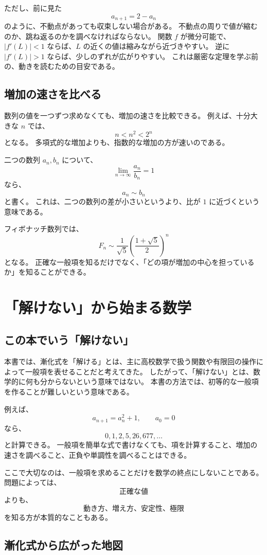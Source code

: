 ただし、前に見た
\[
  a_{n+1}=2-a_n
\]
のように、不動点があっても収束しない場合がある。
不動点の周りで値が縮むのか、跳ね返るのかを調べなければならない。
関数 $f$ が微分可能で、$|f'(L)|<1$ ならば、$L$ の近くの値は縮みながら近づきやすい。
逆に $|f'(L)|>1$ ならば、少しのずれが広がりやすい。
これは厳密な定理を学ぶ前の、動きを読むための目安である。

\subsection{増加の速さを比べる}

数列の値を一つずつ求めなくても、増加の速さを比較できる。
例えば、十分大きな $n$ では、
\[
  n<n^2<2^n
\]
となる。
多項式的な増加よりも、指数的な増加の方が速いのである。

二つの数列 $a_n,b_n$ について、
\[
  \lim_{n\to\infty}\frac{a_n}{b_n}=1
\]
なら、
\[
  a_n\sim b_n
\]
と書く。
これは、二つの数列の差が小さいというより、比が $1$ に近づくという意味である。

フィボナッチ数列では、
\[
  F_n\sim\frac1{\sqrt5}
  \left(\frac{1+\sqrt5}{2}\right)^n
\]
となる。
正確な一般項を知るだけでなく、「どの項が増加の中心を担っているか」を知ることができる。

\section{「解けない」から始まる数学}

\subsection{この本でいう「解けない」}

本書では、漸化式を「解ける」とは、主に高校数学で扱う関数や有限回の操作によって一般項を表せることだと考えてきた。
したがって、「解けない」とは、数学的に何も分からないという意味ではない。
本書の方法では、初等的な一般項を作ることが難しいという意味である。

例えば、
\[
  a_{n+1}=a_n^2+1,\qquad a_0=0
\]
なら、
\[
  0,1,2,5,26,677,\ldots
\]
と計算できる。
一般項を簡単な式で書けなくても、項を計算すること、増加の速さを調べること、正負や単調性を調べることはできる。

ここで大切なのは、一般項を求めることだけを数学の終点にしないことである。
問題によっては、
\[
  \text{正確な値}
\]
よりも、
\[
  \text{動き方、増え方、安定性、極限}
\]
を知る方が本質的なこともある。

\subsection{漸化式から広がった地図}


